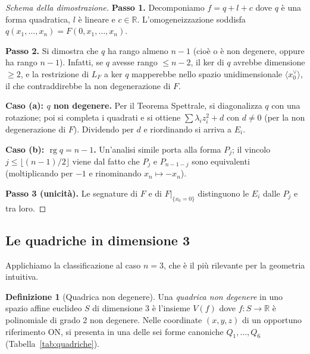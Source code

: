 \documentclass[11pt, a4paper]{book}
\theoremstyle{definition}
\newtheorem{definizione}{Definizione}[section]
\theoremstyle{plain}
\theoremstyle{remark}
\newcommand{\R}{\mathbb{R}}
\DeclareMathOperator{\rg}{rg}
\begin{document}
\begin{proof}[Schema della dimostrazione]
\textbf{Passo 1.} Decomponiamo $f = q + l + c$ dove $q$ è una forma quadratica, $l$ è lineare e $c \in \R$. L'omogeneizzazione soddisfa $q(x_1,\ldots,x_n) = F(0, x_1, \ldots, x_n)$.

\textbf{Passo 2.} Si dimostra che $q$ ha rango almeno $n-1$ (cioè o è non degenere, oppure ha rango $n-1$). Infatti, se $q$ avesse rango $\leq n-2$, il ker di $q$ avrebbe dimensione $\geq 2$, e la restrizione di $L_F$ a ker $q$ mapperebbe nello spazio unidimensionale $\langle x_0^\vee \rangle$, il che contraddirebbe la non degenerazione di $F$.

\textbf{Caso (a): $q$ non degenere.} Per il Teorema Spettrale, si diagonalizza $q$ con una rotazione; poi si completa i quadrati e si ottiene $\sum \lambda_i z_i^2 + d$ con $d \neq 0$ (per la non degenerazione di $F$). Dividendo per $d$ e riordinando si arriva a $E_i$.

\textbf{Caso (b): $\rg q = n-1$.} Un'analisi simile porta alla forma $P_j$; il vincolo $j \leq \lfloor(n-1)/2\rfloor$ viene dal fatto che $P_j$ e $P_{n-1-j}$ sono equivalenti (moltiplicando per $-1$ e rinominando $x_n \mapsto -x_n$).

\textbf{Passo 3 (unicità).} Le segnature di $F$ e di $F|_{\{x_0=0\}}$ distinguono le $E_i$ dalle $P_j$ e tra loro.
\end{proof}

\subsection{Le quadriche in dimensione 3}

Applichiamo la classificazione al caso $n = 3$, che è il più rilevante per la geometria intuitiva.

\begin{defbox}
\begin{definizione}[Quadrica non degenere]
\label{def:quadrica}
Una \emph{quadrica non degenere} in uno spazio affine euclideo $S$ di dimensione 3 è l'insieme $V(f)$ dove $f \colon S \to \R$ è polinomiale di grado 2 non degenere. Nelle coordinate $(x,y,z)$ di un opportuno riferimento ON, si presenta in una delle sei forme canoniche $Q_1, \ldots, Q_6$ (Tabella~\ref{tab:quadriche}).
\end{definizione}
\end{defbox}
\end{document}
